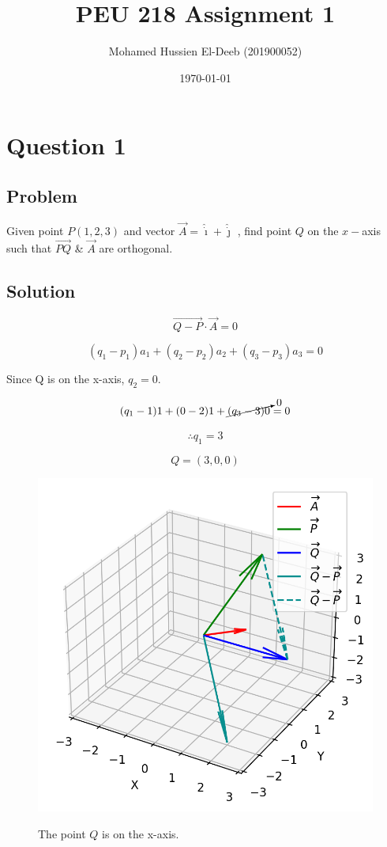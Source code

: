 \documentclass[12pt]{article}
\title{PEU 218 Assignment 1}
\author{Mohamed Hussien El-Deeb (201900052)}
\date{\today}
\begin{document}
\maketitle
\tableofcontents
\newpage
\hypersetup{linkcolor=RoyalBlue4}

\section{Question 1}

\subsection{Problem}

Given point \(P(1, 2, 3)\) and vector \(\vec{A}  = \hat{\dot{\imath}} + \hat{\dot{\jmath}}\)
, find point \(Q\) on the \(x-\)axis such that \(\overrightarrow{PQ} \)
\& \(\vec{A} \) are orthogonal.

\subsection{Solution}

\[\overrightarrow{Q-P} \cdot \vec{A} = 0\]

\[
    (q_1 - p_1)a_1 + (q_2 - p_2)a_2 + (q_3 - p_3)a_3 = 0
\]

Since Q is on the x-axis, \(q_2 = 0\).

\[
    (q_1 - 1)1 + (0 - 2)1 + \cancelto{0}{(q_3 - 3)0} = 0
\]

\[
    \therefore q_1 = 3
\]

\[
    Q = (3, 0, 0)
\]

\begin{figure}[H]
    \includegraphics[width=\linewidth]{Q1.png}\label{fig:Q1}
    \caption{The point \(Q\) is on the x-axis.\cite{El-Deeb_PEU-218_Assignments_py}}
\end{figure}
\end{document}
